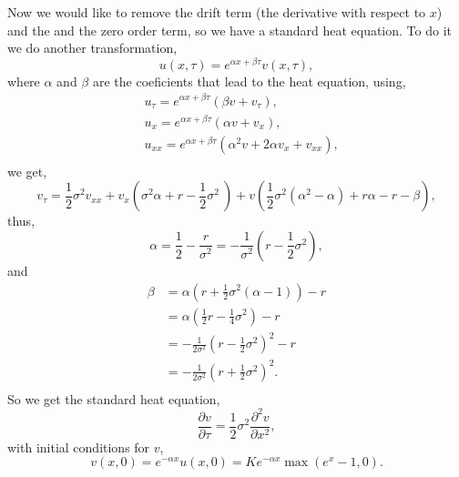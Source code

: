 Now we would like to remove the drift term (the derivative with respect to $x$) and the and the zero order term,
so we have a standard heat equation.
To do it we do another transformation,
\begin{equation*}
    u(x, \tau) = e^{\alpha x + \beta \tau} v(x, \tau),
\end{equation*}
where $\alpha$ and $\beta$ are the coeficients that lead to the heat equation,
using,
\begin{equation*}
\begin{aligned}
    & u_{\tau} = e^{\alpha x + \beta \tau} (\beta v + v_{\tau}),\\
    & u_{x} = e^{\alpha x + \beta \tau} (\alpha v + v_{x}), \\
    & u_{xx} = e^{\alpha x + \beta \tau} (\alpha^2 v + 2 \alpha v_{x} + v_{xx}), \\
\end{aligned}
\end{equation*}
we get,
\begin{equation*}
    v_{\tau} =
        \frac{1}{2} \sigma^2 v_{xx}
        + v_x \left( \sigma^2 \alpha + r - \frac{1}{2} \sigma^2 \ \right)
        + v \left( \frac{1}{2} \sigma^2 (\alpha^2 - \alpha) + r \alpha - r - \beta \right),
\end{equation*}
thus,
\begin{equation*}
    \alpha
        = \frac{1}{2} - \frac{r}{\sigma^2}
        = - \frac{1}{\sigma^2}(r - \frac{1}{2} \sigma^2),
\end{equation*}
and
\begin{equation*}
\begin{aligned}
    \beta
        & = \alpha \left( r + \frac{1}{2} \sigma^2 (\alpha - 1) \right) - r \\
        & = \alpha \left( \frac{1}{2} r - \frac{1}{4} \sigma^2 \right) - r \\
        & = - \frac{1}{2 \sigma^2} \left( r - \frac{1}{2} \sigma^2 \right)^2 - r \\
        & = - \frac{1}{2 \sigma^2} \left( r + \frac{1}{2} \sigma^2 \right)^2. \\
\end{aligned}
\end{equation*}
So we get the standard heat equation,
\begin{equation*}
    \frac{\partial{v}}{\partial \tau} =
        \frac{1}{2} \sigma^2 \frac{\partial^2 v}{\partial x^2},
\end{equation*}
with initial conditions for $v$,
\begin{equation*}
    v(x,0)
        = e^{-\alpha x} u(x, 0)
        = K e^{-\alpha x} \max(e^x - 1, 0).
\end{equation*}

